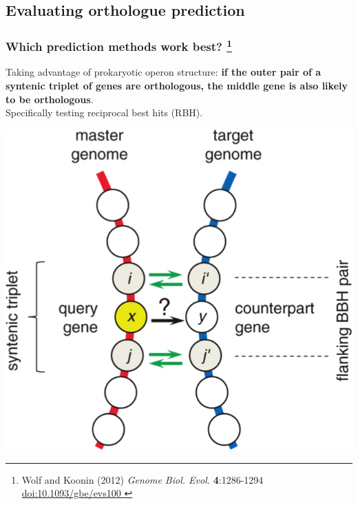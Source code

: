 
\subsection{Evaluating orthologue prediction}

\begin{frame}
  \frametitle{Which prediction methods work best?
    \footnote{\tiny{Wolf and Koonin (2012) \textit{Genome Biol. Evol.} \textbf{4}:1286-1294 \href{http://dx.doi.org/10.1093/gbe/evs100}{doi:10.1093/gbe/evs100
    }}}
  }
  Taking advantage of prokaryotic operon structure: \textcolor{RawSienna}{\textbf{if the outer pair of a syntenic triplet of genes are orthologous, the middle gene is also likely to be orthologous}.}\\
  Specifically testing reciprocal best hits (RBH).
  \begin{center}
      \includegraphics[height=0.45\textheight]{images/syntenic_triplet} 
  \end{center}
\end{frame}


